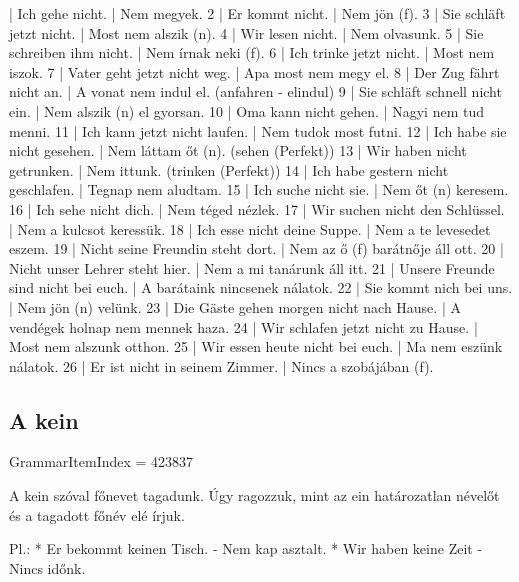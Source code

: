\documentclass{article}
\newenvironment{desc}{\verbatim}{\endverbatim}
\newenvironment{exmp}{\verbatim}{\endverbatim}
\begin{document}
\begin{exmp}
1 | Ich gehe nicht. | Nem megyek.
2 | Er kommt nicht. | Nem jön (f).
3 | Sie schläft jetzt nicht. | Most nem alszik (n).
4 | Wir lesen nicht. | Nem olvasunk.
5 | Sie schreiben ihm nicht. | Nem írnak neki (f).
6 | Ich trinke jetzt nicht. | Most nem iszok.
7 | Vater geht jetzt nicht weg. | Apa most nem megy el.
8 | Der Zug fährt nicht an. | A vonat nem indul el. (anfahren - elindul)
9 | Sie schläft schnell nicht ein. | Nem alszik (n) el gyorsan.
10 | Oma kann nicht gehen. | Nagyi nem tud menni.
11 | Ich kann jetzt nicht laufen. | Nem tudok most futni.
12 | Ich habe sie nicht gesehen. | Nem láttam őt (n). (sehen (Perfekt))
13 | Wir haben nicht getrunken. | Nem ittunk. (trinken (Perfekt))
14 | Ich habe gestern nicht geschlafen. | Tegnap nem aludtam.
15 | Ich suche nicht sie. | Nem őt (n) keresem.
16 | Ich sehe nicht dich. | Nem téged nézlek.
17 | Wir suchen nicht den Schlüssel. | Nem a kulcsot keressük.
18 | Ich esse nicht deine Suppe. | Nem a te levesedet eszem.
19 | Nicht seine Freundin steht dort. | Nem az ő (f) barátnője áll ott.
20 | Nicht unser Lehrer steht hier. | Nem a mi tanárunk áll itt.
21 | Unsere Freunde sind nicht bei euch. | A barátaink nincsenek nálatok.
22 | Sie kommt nich bei uns. | Nem jön (n) velünk.
23 | Die Gäste gehen morgen nicht nach Hause. | A vendégek holnap nem mennek haza.
24 | Wir schlafen jetzt nicht zu Hause. | Most nem alszunk otthon.
25 | Wir essen heute nicht bei euch. | Ma nem eszünk nálatok.
26 | Er ist nicht in seinem Zimmer. | Nincs a szobájában (f).
\end{exmp}

\subsection{A kein}

GrammarItemIndex = 423837

\begin{desc}
A kein szóval főnevet tagadunk. Úgy ragozzuk, mint az ein határozatlan névelőt és a tagadott főnév elé írjuk.

Pl.: * Er bekommt keinen Tisch. - Nem kap asztalt.
* Wir haben keine Zeit - Nincs időnk.
\end{desc}
\end{document}
